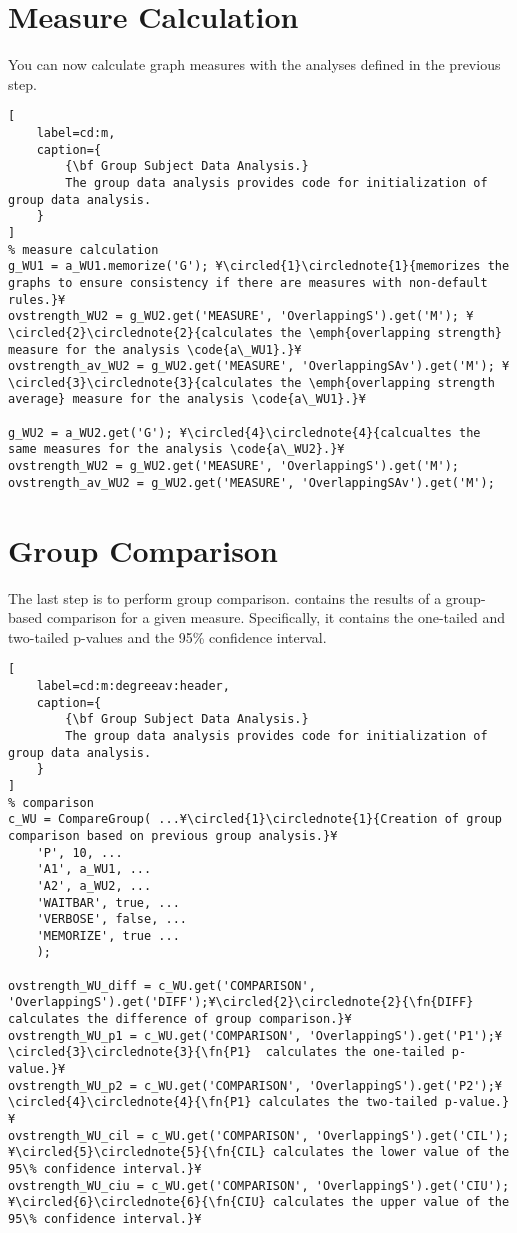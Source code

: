 \documentclass{tufte-handout}
\begin{document}
\section{Measure Calculation}

You can now calculate graph measures with the analyses defined in the previous step.

\begin{lstlisting}[
	label=cd:m,
	caption={
		{\bf Group Subject Data Analysis.}
		The group data analysis provides code for initialization of group data analysis.
	}
]
% measure calculation
g_WU1 = a_WU1.memorize('G'); ¥\circled{1}\circlednote{1}{memorizes the graphs to ensure consistency if there are measures with non-default rules.}¥
ovstrength_WU2 = g_WU2.get('MEASURE', 'OverlappingS').get('M'); ¥\circled{2}\circlednote{2}{calculates the \emph{overlapping strength} measure for the analysis \code{a\_WU1}.}¥
ovstrength_av_WU2 = g_WU2.get('MEASURE', 'OverlappingSAv').get('M'); ¥\circled{3}\circlednote{3}{calculates the \emph{overlapping strength average} measure for the analysis \code{a\_WU1}.}¥

g_WU2 = a_WU2.get('G'); ¥\circled{4}\circlednote{4}{calcualtes the same measures for the analysis \code{a\_WU2}.}¥
ovstrength_WU2 = g_WU2.get('MEASURE', 'OverlappingS').get('M');
ovstrength_av_WU2 = g_WU2.get('MEASURE', 'OverlappingSAv').get('M');
\end{lstlisting}

\section{Group Comparison}

The last step is to perform group comparison.  contains the results of a group-based comparison for a given measure.
Specifically, it contains the one-tailed and two-tailed p-values and the 95\% confidence interval.
\begin{lstlisting}[
	label=cd:m:degreeav:header,
	caption={
		{\bf Group Subject Data Analysis.}
		The group data analysis provides code for initialization of group data analysis.
	}
]
% comparison
c_WU = CompareGroup( ...¥\circled{1}\circlednote{1}{Creation of group comparison based on previous group analysis.}¥
    'P', 10, ...
    'A1', a_WU1, ...
    'A2', a_WU2, ...
    'WAITBAR', true, ...
    'VERBOSE', false, ...
    'MEMORIZE', true ...
    );

ovstrength_WU_diff = c_WU.get('COMPARISON', 'OverlappingS').get('DIFF');¥\circled{2}\circlednote{2}{\fn{DIFF} calculates the difference of group comparison.}¥
ovstrength_WU_p1 = c_WU.get('COMPARISON', 'OverlappingS').get('P1');¥\circled{3}\circlednote{3}{\fn{P1}  calculates the one-tailed p-value.}¥
ovstrength_WU_p2 = c_WU.get('COMPARISON', 'OverlappingS').get('P2');¥\circled{4}\circlednote{4}{\fn{P1} calculates the two-tailed p-value.}¥
ovstrength_WU_cil = c_WU.get('COMPARISON', 'OverlappingS').get('CIL');¥\circled{5}\circlednote{5}{\fn{CIL} calculates the lower value of the 95\% confidence interval.}¥
ovstrength_WU_ciu = c_WU.get('COMPARISON', 'OverlappingS').get('CIU');¥\circled{6}\circlednote{6}{\fn{CIU} calculates the upper value of the 95\% confidence interval.}¥
\end{lstlisting}
\end{document}
